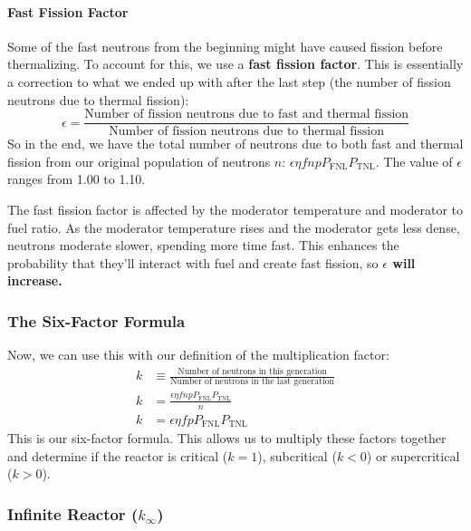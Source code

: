 \documentclass[letter]{article}
\begin{document}
\paragraph{Fast Fission Factor}

Some of the fast neutrons from the beginning might have caused fission
before thermalizing. To account for this, we use a \textbf{fast
  fission factor}. This is essentially a correction to what we ended
up with after the last step (the number of fission neutrons due to
thermal fission):
\begin{equation*}
  \epsilon = \frac{\text{Number of fission neutrons due to fast and
      thermal fission}}{\text{Number of fission neutrons due to
      thermal fission}}
\end{equation*}
So in the end, we have the total number of neutrons due to both fast
and thermal fission from our original population of neutrons $n$:
$\epsilon\eta{}fnpP_{\text{FNL}}P_{\text{TNL}}$. The value of
$\epsilon$ ranges from 1.00 to 1.10.
\begin{framed}
  The fast fission factor is affected by the moderator temperature and
  moderator to fuel ratio. As
  the moderator temperature rises and the moderator gets less dense,
  neutrons moderate slower, spending more time fast. This enhances the
  probability that they'll interact with fuel and create fast
  fission, so \textbf{$\epsilon$ will increase.}\cite[Lec. 13]{lecture}
\end{framed}

\subsubsection{The Six-Factor Formula}
Now, we can use this with our definition of the multiplication factor:
\begin{equation*}
  \begin{split}
    k&\equiv\frac{\text{Number of neutrons in this
        generation}}{\text{Number of neutrons in the last generation}}
    \\
    k&=\frac{\epsilon\eta{}fnpP_{\text{FNL}}P_{\text{TNL}}}{n}\\
    k&=\epsilon\eta{}fpP_{\text{FNL}}P_{\text{TNL}}
  \end{split}\end{equation*}
This is our six-factor formula. This allows us to multiply these
factors together and determine if the reactor is critical ($k=1$),
subcritical ($k<0$) or supercritical ($k>0$).

\subsubsection{Infinite Reactor ($k_\infty$)}
\end{document}
